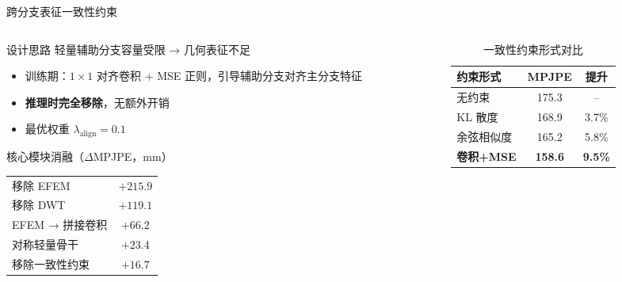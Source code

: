 \documentclass{beamer}
\begin{document}
\begin{frame}[shrink=3]{跨分支表征一致性约束}
    \begin{columns}[T]
        \begin{column}{0.50\textwidth}
            \begin{block}{设计思路}
                \small
                轻量辅助分支容量受限 → 几何表征不足
                \vspace{2pt}
                \begin{itemize}
                    \item 训练期：$1\!\times\!1$ 对齐卷积 + MSE 正则，引导辅助分支对齐主分支特征
                    \item \textbf{推理时完全移除}，无额外开销
                    \item 最优权重 $\lambda_{\mathrm{align}}=0.1$
                \end{itemize}
            \end{block}
            \vspace{4pt}
            \begin{exampleblock}{\small 核心模块消融（$\Delta$MPJPE，mm）}
                \scriptsize
                \setlength{\tabcolsep}{3pt}
                \renewcommand{\arraystretch}{1.0}
                \begin{tabular}{lc}
                    移除 EFEM & $+215.9$ \\
                    移除 DWT & $+119.1$ \\
                    EFEM → 拼接卷积 & $+66.2$ \\
                    对称轻量骨干 & $+23.4$ \\
                    移除一致性约束 & $+16.7$ \\
                \end{tabular}
            \end{exampleblock}
        \end{column}
        \begin{column}{0.47\textwidth}
            \vspace{2pt}
            \begin{table}
                \centering
                \small
                \caption*{一致性约束形式对比}
                \begin{tabular}{lcc}
                    \toprule
                    约束形式 & MPJPE & 提升 \\
                    \midrule
                    无约束 & 175.3 & -- \\
                    KL 散度 & 168.9 & 3.7\% \\
                    余弦相似度 & 165.2 & 5.8\% \\
                    \textbf{卷积+MSE} & \textbf{158.6} & \textbf{9.5\%} \\
                    \bottomrule
                \end{tabular}
            \end{table}
        \end{column}
    \end{columns}
\end{frame}
\end{document}
